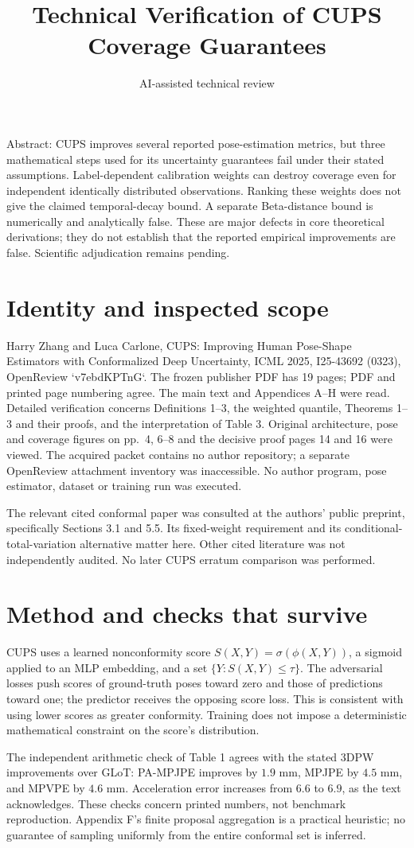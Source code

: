 \documentclass[10pt]{article}
\title{Technical Verification of CUPS Coverage Guarantees}
\author{AI-assisted technical review}
\date{}
\begin{document}
\maketitle
Abstract: CUPS improves several reported pose-estimation metrics, but three mathematical steps used for its uncertainty guarantees fail under their stated assumptions. Label-dependent calibration weights can destroy coverage even for independent identically distributed observations. Ranking these weights does not give the claimed temporal-decay bound. A separate Beta-distance bound is numerically and analytically false. These are major defects in core theoretical derivations; they do not establish that the reported empirical improvements are false. Scientific adjudication remains pending.\par
\section*{Identity and inspected scope}
Harry Zhang and Luca Carlone, CUPS: Improving Human Pose-Shape Estimators with Conformalized Deep Uncertainty, ICML 2025, I25-43692 (0323), OpenReview `v7ebdKPTnG`. The frozen publisher PDF has 19 pages; PDF and printed page numbering agree. The main text and Appendices A–H were read. Detailed verification concerns Definitions 1–3, the weighted quantile, Theorems 1–3 and their proofs, and the interpretation of Table 3. Original architecture, pose and coverage figures on pp. 4, 6–8 and the decisive proof pages 14 and 16 were viewed. The acquired packet contains no author repository; a separate OpenReview attachment inventory was inaccessible. No author program, pose estimator, dataset or training run was executed.\par
The relevant cited conformal paper was consulted at the authors’ public preprint, specifically Sections 3.1 and 5.5. Its fixed-weight requirement and its conditional-total-variation alternative matter here. Other cited literature was not independently audited. No later CUPS erratum comparison was performed.\par
\section*{Method and checks that survive}
CUPS uses a learned nonconformity score \(S(X,Y)=\sigma(\phi(X,Y))\), a sigmoid applied to an MLP embedding, and a set \(\{Y:S(X,Y)\le\tau\}\). The adversarial losses push scores of ground-truth poses toward zero and those of predictions toward one; the predictor receives the opposing score loss. This is consistent with using lower scores as greater conformity. Training does not impose a deterministic mathematical constraint on the score’s distribution.\par
The independent arithmetic check of Table 1 agrees with the stated 3DPW improvements over GLoT: PA-MPJPE improves by \(1.9\) mm, MPJPE by \(4.5\) mm, and MPVPE by \(4.6\) mm. Acceleration error increases from \(6.6\) to \(6.9\), as the text acknowledges. These checks concern printed numbers, not benchmark reproduction. Appendix F’s finite proposal aggregation is a practical heuristic; no guarantee of sampling uniformly from the entire conformal set is inferred.\par
\end{document}
